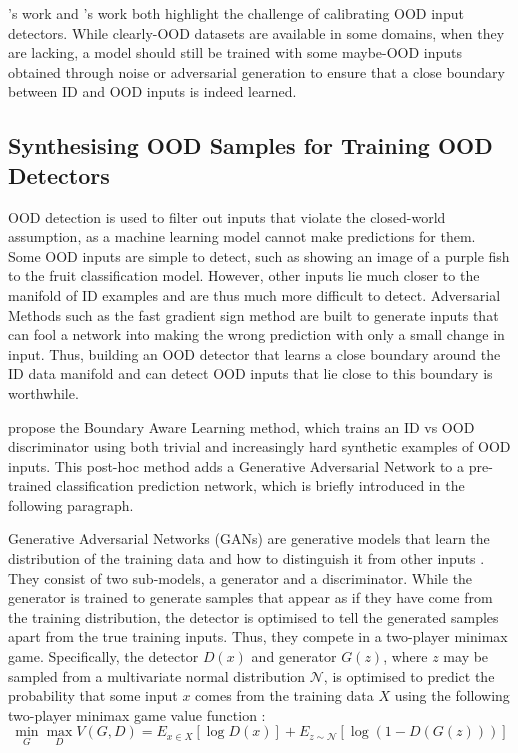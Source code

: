 \citeauthor{learning-ood-confidence-2018}'s work and \citeauthor{ood-exposure-confidence-2021}'s work both highlight the challenge of calibrating OOD input detectors. While clearly-OOD datasets are available in some domains, when they are lacking, a model should still be trained with some maybe-OOD inputs obtained through noise or adversarial generation to ensure that a close boundary between ID and OOD inputs is indeed learned.

\subsection{Synthesising OOD Samples for Training OOD Detectors} \label{txt:ood-input-generation}

OOD detection is used to filter out inputs that violate the closed-world assumption, as a machine learning model cannot make predictions for them. Some OOD inputs are simple to detect, such as showing an image of a purple fish to the fruit classification model. However, other inputs lie much closer to the manifold of ID examples and are thus much more difficult to detect. Adversarial Methods such as the fast gradient sign method \cite{fast-gradient-2014} are built to generate inputs that can fool a network into making the wrong prediction with only a small change in input. Thus, building an OOD detector that learns a close boundary around the ID data manifold and can detect OOD inputs that lie close to this boundary is worthwhile.

\newpar \textcite{ood-boundary-2021} propose the Boundary Aware Learning method, which trains an ID vs OOD discriminator using both trivial and increasingly hard synthetic examples of OOD inputs. This post-hoc method adds a Generative Adversarial Network to a pre-trained classification prediction network, which is briefly introduced in the following paragraph.

\newpar Generative Adversarial Networks (GANs) are generative models that learn the distribution of the training data and how to distinguish it from other inputs \cite{gan-2014}. They consist of two sub-models, a generator and a discriminator. While the generator is trained to generate samples that appear as if they have come from the training distribution, the detector is optimised to tell the generated samples apart from the true training inputs. Thus, they compete in a two-player minimax game. Specifically, the detector $D(x)$ and generator $G(z)$, where $z$ may be sampled from a multivariate normal distribution $\mathcal{N}$, is optimised to predict the probability that some input $x$ comes from the training data $X$ using the following two-player minimax game value function \cite{gan-2014}:
\begin{equation}
    \min_{G} \max_{D} V(G, D) = E_{x \in X}[\log D(x)] + E_{z \sim \mathcal{N}}[\log{(1 - D(G(z)))}]
\end{equation}

